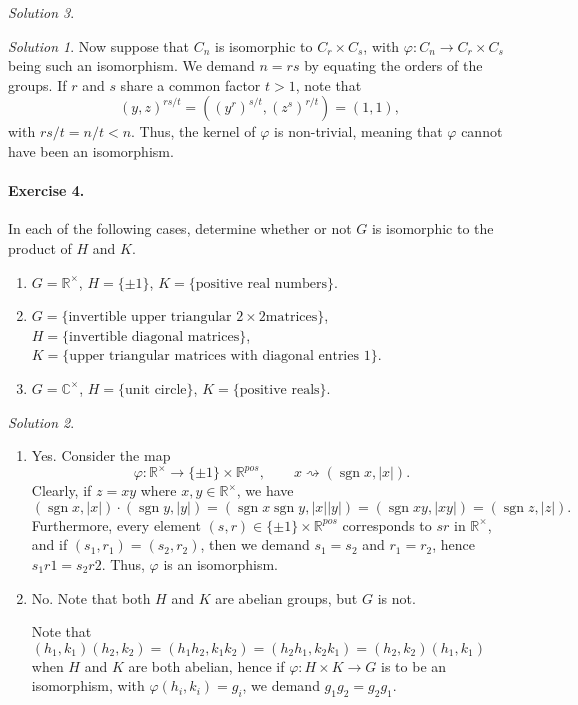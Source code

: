 \documentclass[11pt]{report}
\def\C{\mathbb{C}}
\def\R{\mathbb{R}}
\DeclareMathOperator\sgn{sgn}
\theoremstyle{remark}
\newtheorem*{solution}{Solution}
\begin{document}
\begin{solution}
\begin{solution}
        Now suppose that $C_n$ is isomorphic to $C_r\times C_s$, with $\varphi\colon
        C_n \to C_r\times C_s$ being such an isomorphism. We demand $n = rs$ by
        equating the orders of the groups. If $r$ and $s$ share a common factor $t >
        1$, note that \[
            (y, z)^{rs / t} = ((y^{r})^{s / t}, (z^{s})^{r / t}) = (1, 1),
        \] with $rs / t = n / t < n$. Thus, the kernel of $\varphi$ is non-trivial,
        meaning that $\varphi$ cannot have been an isomorphism.
    \end{solution}
    
    \paragraph{Exercise 4.} In each of the following cases, determine whether or not
    $G$ is isomorphic to the product of $H$ and $K$.
    \begin{enumerate}
        \itemsep0em
        \item $G = \R^\times$, $H = \{\pm 1\}$, $K = \{\text{positive real
        numbers}\}$.
        \item $G = \{\text{invertible upper triangular }2\times 2\text{
        matrices}\}$, $H = \{\text{invertible diagonal matrices}\}$, $K =
        \{\text{upper triangular matrices with diagonal entries }1\}$.
        \item $G = \C^\times$, $H = \{\text{unit circle}\}$, $K = \{\text{positive
        reals}\}$.
    \end{enumerate}
    \begin{solution} \mbox{}
    \begin{enumerate}
        \item Yes. Consider the map \[
            \varphi\colon \R^\times \to \{\pm 1\}\times \R^{pos}, \qquad
            x \rightsquigarrow (\sgn{x}, |x|).
        \] Clearly, if $z = xy$ where $x, y \in \R^\times$, we have \[
            (\sgn{x}, |x|)\cdot(\sgn{y}, |y|) = (\sgn{x}\sgn{y}, |x| |y|) =
            (\sgn{xy}, |xy|) = (\sgn{z}, |z|).
        \] Furthermore, every element $(s, r) \in \{\pm 1\}\times\R^{pos}$
        corresponds to $sr$ in $\R^\times$, and if $(s_1, r_1) = (s_2, r_2)$, then
        we demand $s_1 = s_2$ and $r_1 = r_2$, hence $s_1r1 = s_2r2$. Thus,
        $\varphi$ is an isomorphism.

        \item No. Note that both $H$ and $K$ are abelian groups, but $G$ is not.

        Note that $(h_1, k_1)(h_2, k_2) = (h_1h_2, k_1k_2) = (h_2h_1, k_2k_1) = (h_2,
        k_2)(h_1, k_1)$ when $H$ and $K$ are both abelian, hence if $\varphi\colon
        H\times K \to G$ is to be an isomorphism, with $\varphi(h_i, k_i) = g_i$, we
        demand $g_1g_2 = g_2g_1$.


\end{enumerate}
\end{solution}
\end{solution}
\end{document}
